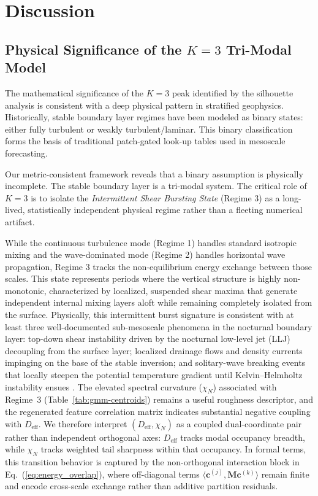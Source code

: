 \section{Discussion}
\label{sec:discussion}

\subsection{Physical Significance of the \texorpdfstring{$K=3$}{K3} Tri-Modal Model}

The mathematical significance of the $K=3$ peak identified by the silhouette analysis is consistent with a deep physical pattern in stratified geophysics. Historically, stable boundary layer regimes have been modeled as binary states: either fully turbulent or weakly turbulent/laminar. This binary classification forms the basis of traditional patch-gated look-up tables used in mesoscale forecasting.

Our metric-consistent framework reveals that a binary assumption is physically incomplete. The stable boundary layer is a tri-modal system. The critical role of $K=3$ is to isolate the \emph{Intermittent Shear Bursting State} (Regime 3) as a long-lived, statistically independent physical regime rather than a fleeting numerical artifact. 

While the continuous turbulence mode (Regime 1) handles standard isotropic mixing and the wave-dominated mode (Regime 2) handles horizontal wave propagation, Regime 3 tracks the non-equilibrium energy exchange between those scales. This state represents periods where the vertical structure is highly non-monotonic, characterized by localized, suspended shear maxima that generate independent internal mixing layers aloft while remaining completely isolated from the surface. Physically, this intermittent burst signature is consistent with at least three well-documented sub-mesoscale phenomena in the nocturnal boundary layer: top-down shear instability driven by the nocturnal low-level jet (LLJ) decoupling from the surface layer; localized drainage flows and density currents impinging on the base of the stable inversion; and solitary-wave breaking events that locally steepen the potential temperature gradient until Kelvin--Helmholtz instability ensues \citep{Sun2015}. The elevated spectral curvature ($\chi_N$) associated with Regime~3 (Table~\ref{tab:gmm-centroids}) remains a useful roughness descriptor, and the regenerated feature correlation matrix indicates substantial negative coupling with $D_{\mathrm{eff}}$. We therefore interpret $(D_{\mathrm{eff}},\chi_N)$ as a coupled dual-coordinate pair rather than independent orthogonal axes: $D_{\mathrm{eff}}$ tracks modal occupancy breadth, while $\chi_N$ tracks weighted tail sharpness within that occupancy.
In formal terms, this transition behavior is captured by the non-orthogonal interaction block in Eq.~(\ref{eq:energy_overlap}), where off-diagonal terms $\langle \mathbf{c}^{(j)}, \mathbf{M}\mathbf{c}^{(k)} \rangle$ remain finite and encode cross-scale exchange rather than additive partition residuals.

